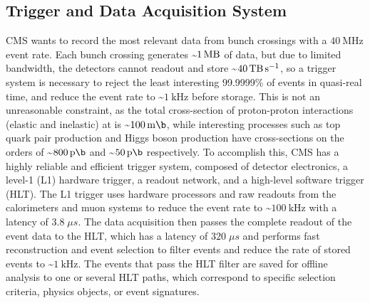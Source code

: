 \subsection{Trigger and Data Acquisition System}
CMS wants to record the most relevant data from bunch crossings with a $\SI{40}{\mega \Hz}$ event rate.
Each bunch crossing generates \sim$\SI{1}{\mega \byte}$ of data, but due to limited bandwidth, the detectors cannot readout and store \sim$\SI{40}{\tera \byte \per \s}$, so a trigger system is necessary to reject the least interesting 99.9999\% of events in quasi-real time, and reduce the event rate to \sim$\SI{1}{\kilo \Hz}$ before storage.
This is not an unreasonable constraint, as the total cross-section of proton-proton interactions (elastic and inelastic) at \beamenergy is \sim$\SI{100}{\milli \b}$, while interesting processes such as top quark pair production and Higgs boson production have cross-sections on the orders of \sim$\SI{800}{\pico \b}$ and \sim$\SI{50}{\pico \b}$ respectively.
To accomplish this, CMS has a highly reliable and efficient trigger system, composed of detector electronics, a level-1 (L1) hardware trigger, a readout network, and a high-level software trigger (HLT).
The L1 trigger uses hardware processors and raw readouts from the calorimeters and muon systems to reduce the event rate to \sim$\SI{100}{\kHz}$ with a latency of $3.8 \; \mu s$.
The data acquisition then passes the complete readout of the event data to the HLT, which has a latency of $320 \; \mu s$ and performs fast reconstruction and event selection to filter events and reduce the rate of stored events to \sim$\SI{1}{\kilo \Hz}$.
The events that pass the HLT filter are saved for offline analysis to one or several HLT paths, which correspond to specific selection criteria, physics objects, or event signatures.



